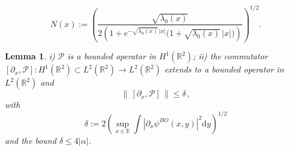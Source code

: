 \documentclass[10pt,a4paper]{amsart}
\newtheorem{lemma}{Lemma}
\newcommand{\PP}{\mathcal P}
\newcommand{\RE}{\mathbb R}
\renewcommand{\d}{\mathrm{d}}
\begin{document}
 \begin{equation}\label{Normalization_constant}
        N(x)  := \left(\frac{\sqrt{\lambda_{0}(x)}}{2\left(1+ e^{-\sqrt{\lambda_{0}(x)}\,|x|}\big(1+ \sqrt{\lambda_{0}(x)}\,|x|\big)\right)} \right)^{1/2} .
    \end{equation}

\begin{lemma}\label{l:PH}  i) $\mathcal P$ is a bounded operator in $H^1(\RE^2)$; 
ii) the commutator $[\partial_{x},\PP]:H^{1}(\RE^{2})\subset L^2(\RE^2)\to L^2(\RE^2)$ extends to a bounded operator in $L^{2}(\RE^{2})$ and 
\begin{equation*}%
\|\,[\partial_{x}, \PP]\,\| \leq \delta\, ,
\end{equation*}
with 
\begin{equation*}%
\delta := 2\left( \sup_{x\in\RE} \int |\partial_x \psi^{BO}(x,y)|^2 \d y \right)^{1/2}
\end{equation*}
and the bound $\delta \leq 4 |\alpha|$.
\end{lemma}
\end{document}
